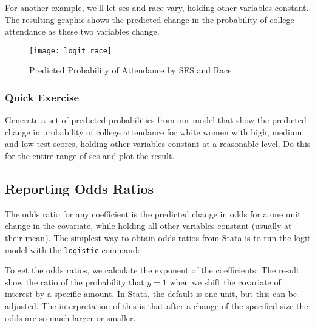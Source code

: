 \documentclass[12pt]{article}
\begin{document}
For another example, we'll let ses and race vary, holding other
variables constant. The resulting graphic shows the predicted change
in the probability of college attendance as these two variables
change. 


\begin{figure}[h]
  \centering
  \texttt{[image: logit\_race]}
  \caption{Predicted Probability of Attendance by SES and Race}
\end{figure}


\subsubsection{Quick Exercise}

Generate a set of predicted probabilities from our model that show the
predicted change in probability of college attendance for white women
with high, medium and low test scores, holding
other variables constant at a reasonable level. Do this
for the entire range of ses and plot the result. 

\subsection{Reporting Odds Ratios}

The odds ratio for any coefficient is the predicted change in odds for
a one unit change in the covariate, while holding all other variables
constant (usually at their mean). The simplest way to obtain odds
ratios from Stata is to run the logit model with the \texttt{logistic}
command:


To get the odds ratios, we calculate the exponent of the
coefficients. The result show the ratio of the probability that $y=1$
when we shift the covariate of interest by a specific amount. In
Stata, the default is one unit, but this can be adjusted. The
interpretation of this is that after a change of the specified size
the odds are so much larger or smaller. 
\end{document}
